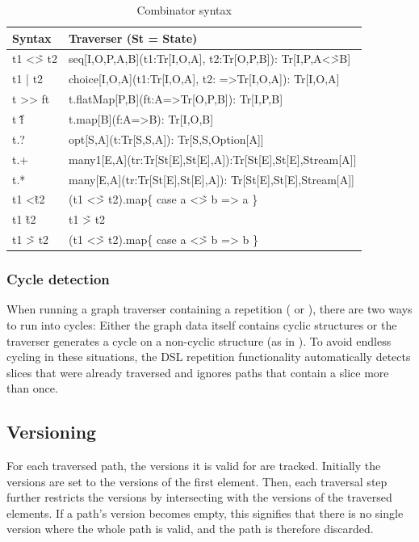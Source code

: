 \begin{table}[hp]
\begin{tabularx}{\textwidth}{>{\ttfamily}l>{\ttfamily}X}
\toprule
Syntax & Traverser (St = State) \\
\midrule
t1 <\~> t2 & seq[I,O,P,A,B](t1:Tr[I,O,A], t2:Tr[O,P,B]): Tr[I,P,A<\~>B]\\
t1 | t2 & choice[I,O,A](t1:Tr[I,O,A], t2: =>Tr[I,O,A]): Tr[I,O,A] \\
t >> ft & t.flatMap[P,B](ft:A=>Tr[O,P,B]): Tr[I,P,B]\\
t \^ \^ f & t.map[B](f:A=>B): Tr[I,O,B]\\
t.? & opt[S,A](t:Tr[S,S,A]): Tr[S,S,Option[A]]\\
t.+ & many1[E,A](tr:Tr[St[E],St[E],A]):Tr[St[E],St[E],Stream[A]]\\
t.* & many[E,A](tr:Tr[St[E],St[E],A]): Tr[St[E],St[E],Stream[A]]\\
\midrule
t1 <\~ t2 & (t1 <\~> t2).map\{ case a <\~> b => a \}\\
t1 \~ t2 & t1 \~> t2\\
t1 \~> t2 & (t1 <\~> t2).map\{ case a <\~> b => b \}\\
\bottomrule
\end{tabularx}
\caption{Combinator syntax}\label{tab:comboSyntax}
\end{table}


\subsubsection{Cycle detection}\label{sec:cycle}
When running a graph traverser containing a repetition ( or ), there are two ways to run into cycles: 
Either the graph data itself contains cyclic structures or the traverser generates a cycle on a non-cyclic structure (as in ).
To avoid endless cycling in these situations, the DSL repetition functionality automatically detects slices that were already traversed and ignores paths that contain a slice more than once.


\subsection{Versioning}\label{sec:versioning}
For each traversed path, the versions it is valid for are tracked. Initially the versions are set to the versions of the first element. Then, each traversal step further restricts the versions by intersecting with the versions of the traversed elements. If a path's version becomes empty, this signifies that there is no single version where the whole path is valid, and the path is therefore discarded.

